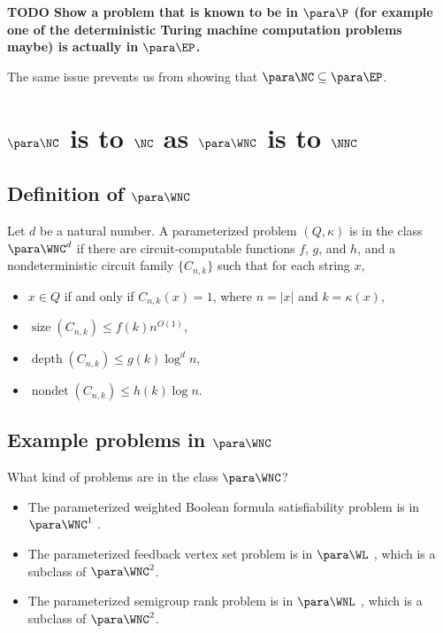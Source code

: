 \documentclass{article}
\newcommand{\todo}[1]{\textbf{TODO #1}}
\DeclareMathOperator{\depth}{depth}
\DeclareMathOperator{\nondet}{nondet}
\DeclareMathOperator{\size}{size}
\begin{document}
\todo{Show a problem that is known to be in $\para \P$ (for example one of the deterministic Turing machine computation problems maybe) is actually in $\para \EP$.}

The same issue prevents us from showing that $\para \NC \subseteq \para \EP$.

\section{\texorpdfstring{$\para \NC$}{paraNC} is to \texorpdfstring{$\NC$}{NC} as \texorpdfstring{$\para \WNC$}{paraWNC} is to \texorpdfstring{$\NNC$}{NNC}}

\subsection{Definition of \texorpdfstring{$\para \WNC$}{paraWNC}}

\begin{definition}
  Let $d$ be a natural number.
  A parameterized problem $(Q, \kappa)$ is in the class $\para \WNC^d$ if there are circuit-computable functions $f$, $g$, and $h$, and a nondeterministic circuit family $\{C_{n, k}\}$ such that for each string $x$,
  \begin{itemize}
  \item $x \in Q$ if and only if $C_{n, k}(x) = 1$, where $n = |x|$ and $k = \kappa(x)$,
  \item $\size(C_{n, k}) \leq f(k) n^{O(1)}$,
  \item $\depth(C_{n, k}) \leq g(k) \log^d n$,
  \item $\nondet(C_{n, k}) \leq h(k) \log n$.
  \end{itemize}
\end{definition}

\subsection{Example problems in \texorpdfstring{$\para \WNC$}{paraWNC}}
\label{sec:rankinwp}

What kind of problems are in the class $\para \WNC$?

\begin{itemize}
\item The parameterized weighted Boolean formula satisfiability problem is in $\para \WNC^1$ \autocite[Theorem~3.6]{est15}.
\item The parameterized feedback vertex set problem is in $\para \WL$ \autocite[Section~4.3]{est15}, which is a subclass of $\para \WNC^2$.
\item The parameterized semigroup rank problem is in $\para \WNL$ \autocite[Theorem~3.12]{est15}, which is a subclass of $\para \WNC^2$.
\end{itemize}
\end{document}
